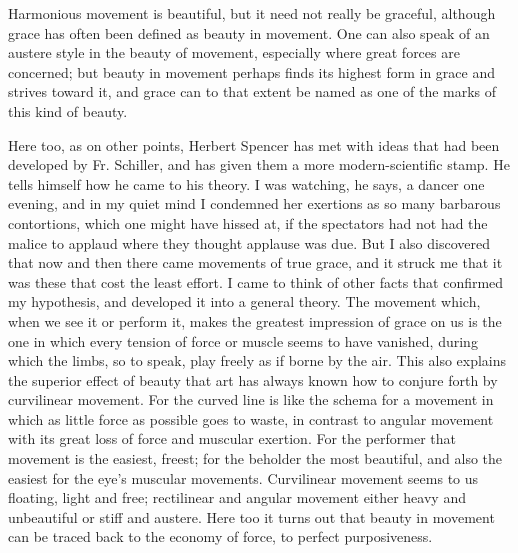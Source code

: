 \documentclass[12pt,a4paper,openany]{book}
\newcommand{\opage}[1]{\marginnote{\footnotesize\textit{[#1]}}}
\begin{document}
Harmonious movement is beautiful, but it need not
really be graceful, although grace has often been defined as
beauty in movement. One can also speak of an austere
style in the beauty of movement, especially where great forces
are concerned; but beauty in movement perhaps finds
its highest form in grace and strives toward it, and
grace can to that extent be named as one of the marks of this
kind of beauty.

Here too, as on other points, Herbert Spencer has
met with ideas that had been developed by Fr. Schiller,
and has given them a more modern-scientific stamp. He
tells himself how he came to his theory. I was watching,
he says, a dancer one evening, and in my quiet mind
I condemned her exertions as so many barbarous
contortions, which one might have hissed at, if
the spectators had not had the malice to applaud where
they thought applause was due. But I also discovered
that now and then there came movements of true grace, and it struck me
that it was these that cost the least effort. I came
to think of other facts that confirmed my
hypothesis, and developed it into a general theory. The
movement which, when we see it or perform it, makes the
greatest impression of grace on us is the one in which every
tension of force or muscle seems to have vanished,
during which the limbs, so to speak, play freely as if borne by
the air. This also explains the superior effect of beauty
that art has always known how to conjure forth by
curvilinear movement. For the curved line is like the schema
for a movement in which as little force as possible goes to
\setcounter{footnote}{0}%
\opage{271}waste, in contrast to angular movement
with its great loss of force and muscular exertion. For the performer
that movement is the easiest, freest; for the beholder the
most beautiful, and also the easiest for the eye's muscular movements.
Curvilinear movement seems to us floating, light and free;
rectilinear and angular movement either heavy and unbeautiful or stiff and
austere. Here too it turns out that beauty in movement
can be traced back to the economy of force, to perfect
purposiveness.
\end{document}
